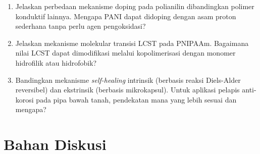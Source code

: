 \documentclass[12pt,a4paper,openany]{book}
\begin{document}
\begin{enumerate}
\item Jelaskan perbedaan mekanisme doping pada polianilin dibandingkan polimer konduktif lainnya. Mengapa PANI dapat didoping dengan asam proton sederhana tanpa perlu agen pengoksidasi?

\item Jelaskan mekanisme molekular transisi LCST pada PNIPAAm. Bagaimana nilai LCST dapat dimodifikasi melalui kopolimerisasi dengan monomer hidrofilik atau hidrofobik?

\item Bandingkan mekanisme \textit{self-healing} intrinsik (berbasis reaksi Diels-Alder reversibel) dan ekstrinsik (berbasis mikrokapsul). Untuk aplikasi pelapis anti-korosi pada pipa bawah tanah, pendekatan mana yang lebih sesuai dan mengapa?

\end{enumerate}

\section{Bahan Diskusi}
\end{document}
